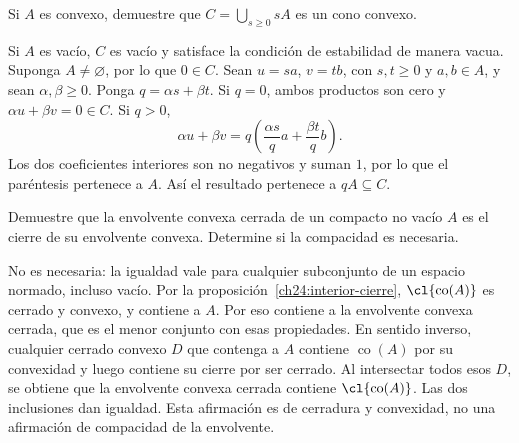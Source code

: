 \begin{ejercicio}\label{ej:lectura-24-5}
Si $A$ es convexo, demuestre que $C=\bigcup_{s\geq0}sA$ es un cono convexo.
\end{ejercicio}
\begin{solucion}
Si $A$ es vacío, $C$ es vacío y satisface la condición de estabilidad de manera vacua. Suponga $A\ne\varnothing$, por lo que $0\in C$. Sean $u=sa$, $v=tb$, con $s,t\geq0$ y $a,b\in A$, y sean $\alpha,\beta\geq0$. Ponga $q=\alpha s+\beta t$. Si $q=0$, ambos productos son cero y $\alpha u+\beta v=0\in C$. Si $q>0$,
\[
 \alpha u+\beta v
 =q\left(\frac{\alpha s}{q}a+\frac{\beta t}{q}b\right).
\]
Los dos coeficientes interiores son no negativos y suman $1$, por lo que el paréntesis pertenece a $A$. Así el resultado pertenece a $qA\subseteq C$.
\end{solucion}

\begin{ejercicio}\label{ej:lectura-24-6}
Demuestre que la envolvente convexa cerrada de un compacto no vacío $A$ es el cierre de su envolvente convexa. Determine si la compacidad es necesaria.
\end{ejercicio}
\begin{solucion}
No es necesaria: la igualdad vale para cualquier subconjunto de un espacio normado, incluso vacío. Por la proposición~\ref{ch24:interior-cierre}, $\cl{\operatorname{co}(A)}$ es cerrado y convexo, y contiene a $A$. Por eso contiene a la envolvente convexa cerrada, que es el menor conjunto con esas propiedades. En sentido inverso, cualquier cerrado convexo $D$ que contenga a $A$ contiene $\operatorname{co}(A)$ por su convexidad y luego contiene su cierre por ser cerrado. Al intersectar todos esos $D$, se obtiene que la envolvente convexa cerrada contiene $\cl{\operatorname{co}(A)}$. Las dos inclusiones dan igualdad. Esta afirmación es de cerradura y convexidad, no una afirmación de compacidad de la envolvente.
\end{solucion}

